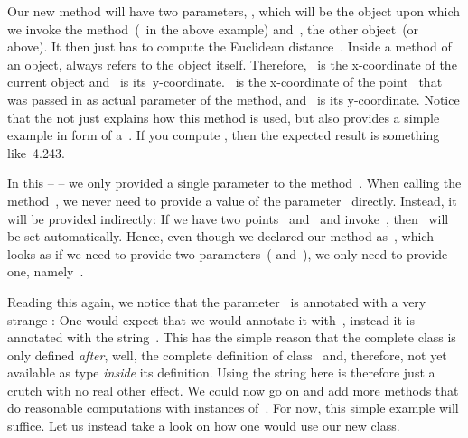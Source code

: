 Our new method  will have two parameters, , which will be the object upon which we invoke the method~(~in the above example) and~, the other object~(or  above).
It then just has to compute the Euclidean distance~.
Inside a method of an object,  always refers to the object itself.
Therefore, ~is the x\nobreakdashes-coordinate of the current object and ~is its~y\nobreakdashes-coordinate.
~is the x\nobreakdashes-coordinate of the point~ that was passed in as actual parameter of the method, and ~is its y\nobreakdashes-coordinate.
Notice that the  not just explains how this method is used, but also provides a simple example in form of a~.
If you compute , then the expected result is something like~4.243.%
%
\begin{sloppypar}%
In this  --  -- we only provided a single parameter to the method~.
When calling the method~, we never need to provide a value of the parameter~ directly.
Instead, it will be provided indirectly:
If we have two points~ and~ and invoke~, then~ will be set automatically.
Hence, even though we declared our method as~, which looks as if we need to provide two parameters~( and~), we only need to provide one, namely~.%
\end{sloppypar}%
%
Reading this again, we notice that the parameter~ is annotated with a very strange :
One would expect that we would annotate it with~, instead it is annotated with the string~.
This has the simple reason that the complete class  is only defined \emph{after}, well, the complete definition of class~ and, therefore, not yet available as type \emph{inside} its definition.
Using the string here is therefore just a crutch with no real other effect.
%
%
%
%
%
We could now go on and add more methods that do reasonable computations with instances of~.
For now, this simple example will suffice.
Let us instead take a look on how one would use our new class.

